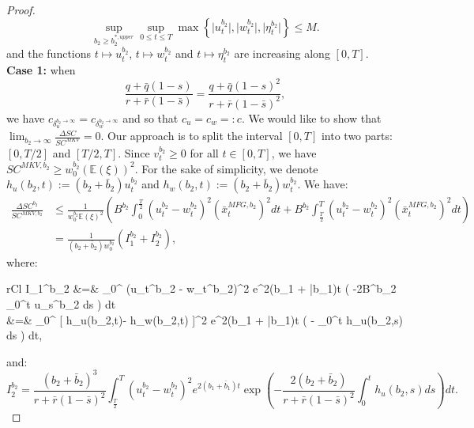 \documentclass[11pt]{article}
\begin{document}
\begin{proof}
	\begin{equation}
	\sup_{b_2 \geq b_2^{*,upper}} \sup_{0 \leq t \leq T} \max \left\{ \vert u_t^{b_2} \vert , \vert w_t^{b_2} \vert, \vert \eta_t^{b_2} \vert \right\} \leq M.
	\label{eq:ut_wt_upper_bound_b2_infty}
	\end{equation}
	and the functions $t \mapsto u_t^{b_2}$, $t \mapsto w_t^{b_2}$ and $t \mapsto \eta_t^{b_2}$ are increasing along $[0,T]$. \\
	
	\textbf{Case 1:} when
	\begin{equation*}
	\frac{q+\bar{q}(1-s)}{r+\bar{r}(1-\bar{s})}=\frac{q+\bar{q}(1-s)^2}{r+\bar{r}(1-\bar{s})^2},
	\end{equation*}
	we have $c_{\delta_u^{b_2 \to \infty}}=c_{\delta_w^{b_2 \to \infty}}$ and so that $c_u = c_w =: c$. 
	We would like to show that $\lim_{b_2 \to \infty} \frac{\Delta SC}{SC^{MKV}} = 0$. Our approach is to split the interval $[0,T]$ into two parts: $[0,T/2]$ and $[T/2,T]$.	
	Since $v^{b_2}_t \geq 0$ for all $t\in [0,T]$, we have $SC^{MKV,b_2} \geq w_0^{b_2} (\mathbb{E}(\xi))^2$.	For the sake of simplicity, we denote $h_u(b_2,t) := (b_2 + \bar{b}_2) u_{t}^{b_2}$ and $h_w(b_2,t) := (b_2 + \bar{b}_2)w_t^{b_2}$. We have:
	\begin{equation}
	\begin{split}
		\frac{\Delta SC^{b_2}}{SC^{MKV,b_2}} &\leq \frac{1}{w_0^{b_2} \mathbb{E}(\xi)^2 } \left( B^{b_2} \int_{0}^{\frac{T}{2}} (u_t^{b_2} - w_t^{b_2})^2 (\bar{x}_t^{MFG,b_2})^2 dt + B^{b_2} \int_{\frac{T}{2}}^{T} (u_t^{b_2} - w_t^{b_2})^2 (\bar{x}_t^{MFG,b_2})^2 dt \right) \\ 
		&=  \frac{1}{(b_2 + \bar{b}_2) w_0^{b_2} } \left( I_1^{b_2} + I_2^{b_2} \right),
	\end{split}
	\label{eq:I_1_plus_I_2}
	\end{equation}
	where:
	\begin{IEEEeqnarray*}{rCl}
	I_1^{b_2} &=&   \int_0^{} (u_t^{b_2} - w_t^{b_2})^2 e^{2(b_1 + \bar{b}_1)t} \exp \left( -2B^{b_2} \int_0^{t} u_s^{b_2} ds 
	\right) dt \\
	&=&  \int_0^{} [ h_u(b_2,t)- h_w(b_2,t) ]^2 \cdot e^{2(b_1 + \bar{b}_1)t} \exp \left( -   \int_0^t h_u(b_2,s) ds \right) dt, 
	\end{IEEEeqnarray*}
	and:
	$$
		I_2^{b_2} = \frac{(b_2 + \bar{b}_2)^3}{r + \bar{r}(1-\bar{s})^2}  \int_{\frac{T}{2}}^T (u_t^{b_2} - w_t^{b_2})^2 e^{2(b_1 + \bar{b}_1)t} \exp \left( -\frac{2 (b_2 + \bar{b}_2)}{r + \bar{r}(1-\bar{s})^2} \int_0^{t} h_u(b_2,s) ds \right) dt.
	$$
	

\end{proof}
\end{document}
